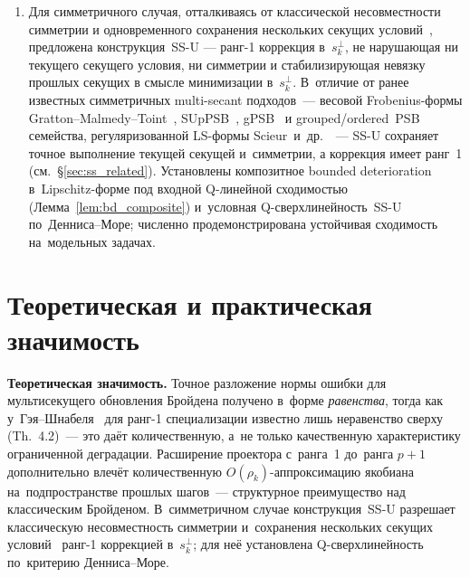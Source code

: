 \begin{enumerate}[leftmargin=*]
\begin{enumerate}[label=(\alph*),leftmargin=*]
                соответствующего одномерного члена в~анализе
                классического Бройдена;
          \item покомпонентное разложение ошибки $E_k$ по подпространствам
                $\operatorname{col}(S_p)$ и $\operatorname{col}(S_p)^\perp$
                с количественной $O(\rho_k)$-оценкой аппроксимации
                якобиана на $\operatorname{col}(S_p)$
                (см.~следствие~\ref{cor:subspace-alignment}).
        \end{enumerate}
  \item Для симметричного случая, отталкиваясь от классической
        несовместности симметрии и одновременного сохранения нескольких
        секущих условий~\cite{schnabel1983}, предложена конструкция~SS-U
        --- ранг-1 коррекция в~$s_k^{\perp}$, не нарушающая ни текущего
        секущего условия, ни симметрии и стабилизирующая невязку прошлых
        секущих в смысле минимизации в~$s_k^{\perp}$. В~отличие от
        ранее известных симметричных multi-secant подходов~--- весовой
        Frobenius-формы Gratton--Malmedy--Toint~\cite{gratton2015},
        SUpPSB~\cite{boutet2020}, gPSB~\cite{boutet2021} и
        grouped/ordered~PSB~\cite{boutet2022} семейства, регуляризованной
        LS-формы Scieur~и~др.~\cite{scieur2021}~--- SS-U сохраняет точное
        выполнение текущей секущей и~симметрии, а коррекция имеет ранг~1
        (см.\ \S\ref{sec:ss_related}). Установлены композитное bounded
        deterioration в~Lipschitz-форме под входной Q-линейной
        сходимостью (Лемма~\ref{lem:bd_composite}) и~условная
        Q-сверхлинейность~SS-U по~Денниса--Море; численно
        продемонстрирована устойчивая сходимость на~модельных задачах.
\end{enumerate}

\section*{Теоретическая и практическая значимость}

\textbf{Теоретическая значимость.} Точное разложение нормы ошибки для
мультисекущего обновления Бройдена получено в~форме \emph{равенства},
тогда как у~Гэя--Шнабеля~\cite{gay_schnabel1978} для ранг-1 специализации
известно лишь неравенство сверху (Th.~4.2)~--- это даёт количественную,
а~не только качественную характеристику ограниченной деградации.
Расширение проектора с~ранга~1 до~ранга $p{+}1$ дополнительно влечёт
количественную $O(\rho_k)$-аппроксимацию якобиана на~подпространстве
прошлых шагов~--- структурное преимущество над классическим Бройденом.
В~симметричном случае конструкция~SS-U разрешает классическую
несовместность симметрии и~сохранения нескольких секущих
условий~\cite{schnabel1983} ранг-1 коррекцией в~$s_k^\perp$; для неё
установлена Q-сверхлинейность по~критерию Денниса--Море.

